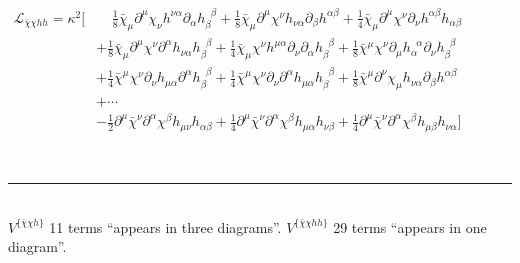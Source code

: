 \documentclass[aspectratio=169,usenames,dvipsnames]{beamer}
\begin{document}
\begin{frame}
\begin{minipage}{.082\textwidth}
	\centering
  \vspace{10mm}
\end{minipage}
\begin{minipage}{.91\textwidth}
\scriptsize\begin{align*}  
             \mathcal{L}_{\bar{\chi} \chi h h} =  \kappa^2 \Big [  &
\;\;\;\;        \frac{1}{8}  \bar{\chi}_{\mu} \partial^{\mu} \chi_{\nu} h^{\nu \alpha} \partial_{\alpha} h_{ \beta}^{\;\;\beta}
       + \frac{1}{8}  \bar{\chi}_{\mu} \partial^{\mu} \chi^{ \nu} h_{\nu \alpha} \partial_{\beta} h^{ \alpha \beta}
       + \frac{1}{4}  \bar{\chi}_{\mu} \partial^{\mu} \chi^{ \nu} \partial_{\nu} h^{ \alpha \beta} h_{\alpha \beta}
\qquad\quad\; \\ &       + \frac{1}{8}  \bar{\chi}_{\mu} \partial^{\mu} \chi^{ \nu} \partial^{\alpha} h_{ \nu \alpha} h_{\beta}^{\;\;\beta}
       + \frac{1}{4}  \bar{\chi}_{\mu} \chi^{\nu} h^{\mu \alpha} \partial_{\nu}\partial_{\alpha} h_{\beta}^{\;\;\beta}
       + \frac{1}{8}  \bar{\chi}^{\mu} \chi^{\nu} \partial_{\mu} h_{ \alpha}^{\;\;\alpha} \partial_{\nu} h_{ \beta}^{\;\;\beta}
\\ &       + \frac{1}{4}  \bar{\chi}^{\mu} \chi^{\nu} \partial_{\nu} h_{ \mu \alpha} \partial^{\alpha} h_{ \beta}^{\;\;\beta}
       + \frac{1}{4}  \bar{\chi}^{\mu} \chi^{\nu} \partial_{\nu} \partial^{\alpha} h_{\mu \alpha} h_{\beta}^{\;\;\beta}
       + \frac{1}{8}  \bar{\chi}^{\mu} \partial^{\nu} \chi_{ \mu} h_{\nu \alpha} \partial_{\beta} h^{ \alpha \beta}
\\[0.5mm] &    + \cdots  
\\[0.5mm] &       - \frac{1}{2}  \partial^{\mu} \bar{\chi}^{ \nu} \partial^{\alpha} \chi^{ \beta} h_{\mu \nu} h_{\alpha \beta}
       + \frac{1}{4}  \partial^{\mu} \bar{\chi}^{ \nu} \partial^{\alpha} \chi^{ \beta} h_{\mu \alpha} h_{\nu \beta}
       + \frac{1}{4}  \partial^{\mu} \bar{\chi}^{ \nu} \partial^{\alpha} \chi^{
         \beta} h_{\mu \beta} h_{\nu \alpha} \Big ]
\end{align*}
\end{minipage}\\[2mm]

\textcolor{LUCopper}{\rule{\textwidth}{1pt}}\\
\tiny $V^{\{\bar{\chi}\chi h\}}$ 11 terms ``appears in three diagrams''. \hfill
$V^{\{\bar{\chi}\chi h h\}}$ 29 terms ``appears in one diagram''.
\vspace{100mm}
\end{frame}
\end{document}
